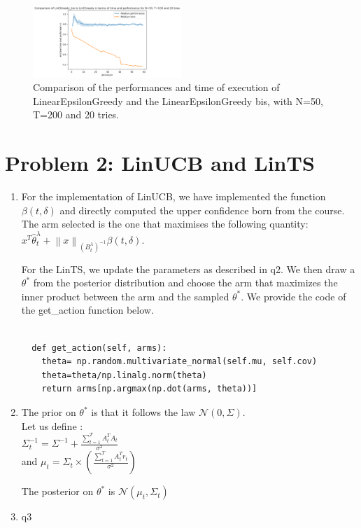 \begin{enumerate}
\begin{figure}[h]
    \centering
    \includegraphics[width=0.5\textwidth]{images/comparison.png}
    \caption{Comparison of the performances and time of execution of LinearEpsilonGreedy and the LinearEpsilonGreedy bis, with N=50, T=200 and 20 tries.} 
    \label{fig:lin_epsilon_greedy}
\end{figure}





\end{enumerate}


\section{Problem 2: LinUCB and LinTS}


\begin{enumerate}
    \item For the implementation of LinUCB, we have implemented the function $\beta(t,\delta)$ and directly computed the upper confidence born from the course. The arm selected is the one that maximises the following quantity: \\
     $x^T\hat{\theta }^\lambda _t + \left\lVert x\right\rVert _{(B_t^\lambda)^{-1} } \beta(t, \delta) $. 

    For the LinTS, we update the parameters as described in q2. We then draw a $\theta^*$ from the posterior distribution and choose the arm that maximizes the inner product between the arm and the sampled $\theta^*$.
    We provide the code of the get\_action function below.
    \begin{lstlisting}
        
  def get_action(self, arms):
    theta= np.random.multivariate_normal(self.mu, self.cov)
    theta=theta/np.linalg.norm(theta)
    return arms[np.argmax(np.dot(arms, theta))]
    \end{lstlisting}
    \item The prior on $\theta^*$ is that it follows the law $\mathcal{N}(0, \Sigma)$. \\
    
Let us define : \\
$\Sigma_t ^{-1} = \Sigma^{-1} + \frac{\sum_{t=1}^{T} A_t^T A_t}{\sigma^2}$ \\

and $\mu_t = \Sigma_t \times (\frac{\sum_{t=1}^{T} A_t^T r_t}{\sigma^2})$


The posterior on  $\theta^*$ is  $\mathcal{N}(\mu_t, \Sigma_t)$
    \item q3
\end{enumerate}


